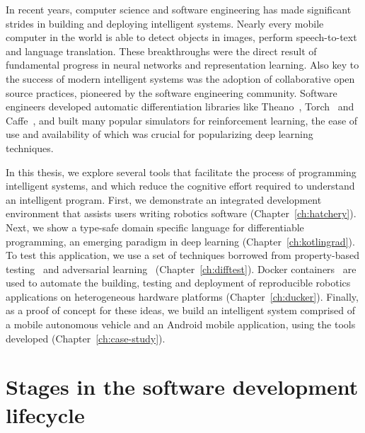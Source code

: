 \documentclass[12pt,initial,twoside,maitrise]{dms}
\numberwithin{equation}{section}
\numberwithin{table}{chapter}
\numberwithin{figure}{chapter}
\begin{document}
In recent years, computer science and software engineering has made significant strides in building and deploying intelligent systems. Nearly every mobile computer in the world is able to detect objects in images, perform speech-to-text and language translation. These breakthroughs were the direct result of fundamental progress in neural networks and representation learning. Also key to the success of modern intelligent systems was the adoption of collaborative open source practices, pioneered by the software engineering community. Software engineers developed automatic differentiation libraries like Theano~\citep{theano}, Torch~\citep{collobert2002torch} and Caffe~\citep{jia2014caffe}, and built many popular simulators for reinforcement learning, the ease of use and availability of which was crucial for popularizing deep learning techniques.

In this thesis, we explore several tools that facilitate the process of programming intelligent systems, and which reduce the cognitive effort required to understand an intelligent program. First, we demonstrate an integrated development environment that assists users writing robotics software (Chapter~\ref{ch:hatchery}). Next, we show a type-safe domain specific language for differentiable programming, an emerging paradigm in deep learning (Chapter~\ref{ch:kotlingrad}). To test this application, we use a set of techniques borrowed from property-based testing~\citep{fink1997property} and adversarial learning~\citep{lowd2005adversarial} (Chapter~\ref{ch:difftest}). Docker containers~\citep{merkel2014docker} are used to automate the building, testing and deployment of reproducible robotics applications on heterogeneous hardware platforms (Chapter~\ref{ch:ducker}). Finally, as a proof of concept for these ideas, we build an intelligent system comprised of a mobile autonomous vehicle and an Android mobile application, using the tools developed (Chapter~\ref{ch:case-study}).

\section{Stages in the software development lifecycle}\label{sec:sldc-stages}
\end{document}
